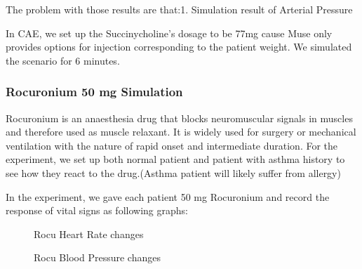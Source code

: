 \documentclass[a4paper]{article}
\begin{document}
The problem with those results are that:1. Simulation result of Arterial Pressure 

In CAE, we set up the Succinycholine's dosage to be 77mg cause Muse only provides options for injection corresponding to the patient weight. We simulated the scenario for 6 minutes. 

\subsubsection{Rocuronium 50 mg Simulation}

Rocuronium is an anaesthesia drug that blocks neuromuscular signals in muscles and therefore used as muscle relaxant. It is widely used for surgery or mechanical ventilation with the nature of rapid onset and intermediate duration. For the experiment, we set up both normal patient and patient with asthma history to see how they react to the drug.(Asthma patient will likely suffer from allergy)

In the experiment, we gave each patient 50 mg Rocuronium and record the response of vital signs as following graphs:

\begin{figure}[!htb]\centering
   \begin{minipage}{0.49\textwidth}
     \caption{Rocu Heart Rate changes }
     \label{fig:given 50 mg Rocuronium}
     
   \end{minipage}
   \begin{minipage}{0.49\textwidth}
     \caption{Rocu Blood Pressure changes}
     \label{fig:given 50 mg Rocuronium}
     
   \end{minipage}
\end{figure}
\end{document}
